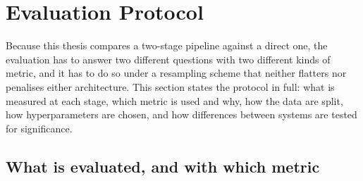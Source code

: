 %
%
%
%

\section{Evaluation Protocol}
\label{sec:evaluation_protocol}

Because this thesis compares a two-stage pipeline against a direct one, the evaluation
has to answer two different questions with two different kinds of metric, and it has to
do so under a resampling scheme that neither flatters nor penalises either architecture.
This section states the protocol in full: what is measured at each stage, which metric is
used and why, how the data are split, how hyperparameters are chosen, and how differences
between systems are tested for significance.

\subsection{What is evaluated, and with which metric}


